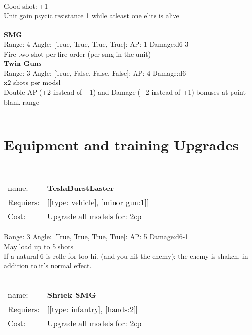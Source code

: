 \ \\
Good shot: +1\\ 
Unit gain psycic resistance 1 while atleast one elite is alive\\ 

\ \\
{\bf SMG } \\



Range: 4  Angle: [True, True, True, True]: AP: 1 Damage:d6-3 \\
Fire two shot per fire order (per smg in the unit)\\ 




{\bf Twin Guns } \\



Range: 3  Angle: [True, False, False, False]: AP: 4 Damage:d6 \\
x2 shots per model\\ 
Double AP (+2 instead of +1) and Damage (+2 instead of +1) bonuses at point blank range\\ 




 
\ \\

\section{Equipment and training Upgrades}\ \\
\begin{tabular}{ll}
name: & {\bf TeslaBurstLaster } \\
Requiers: & [[type: vehicle], [minor gun:1]] \\
Cost: & Upgrade all models for: 2cp \\
\end{tabular}



Range: 3  Angle: [True, True, True, True]: AP: 5 Damage:d6-1 \\
May load up to 5 shots\\ 
If a natural 6 is rolle for too hit (and you hit the enemy): the enemy is shaken, in addition to it's normal effect.\\ 








\ \\
\begin{tabular}{ll}
name: & {\bf Shriek SMG } \\
Requiers: & [[type: infantry], [hands:2]] \\
Cost: & Upgrade all models for: 2cp \\
\end{tabular}



